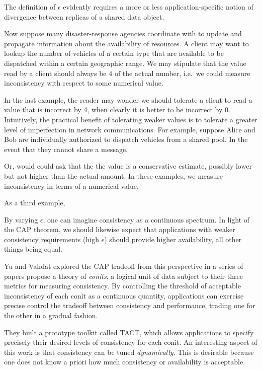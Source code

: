 \documentclass[]             %
{NASA}                       %
\theoremstyle{definition}
\begin{document}
The definition of \(\epsilon\) evidently requires a more or less
application-specific notion of divergence between replicas of a shared
data object.

Now suppose many disaster-response agencies coordinate with to update
and propagate information about the availability of resources. A client
may want to lookup the number of vehicles of a certain type that are
available to be dispatched within a certain geographic range. We may
stipulate that the value read by a client should always be \(4\) of the
actual number, i.e.~we could measure inconsistency with respect to some
numerical value.

In the last example, the reader may wonder we should tolerate a client
to read a value that is incorrect by 4, when clearly it is better to be
incorrect by 0. Intuitively, the practical benefit of tolerating weaker
values is to tolerate a greater level of imperfection in network
communications. For example, suppose Alice and Bob are individually
authorized to dispatch vehicles from a shared pool. In the event that
they cannot share a message.

Or, would could ask that the the value is a conservative estimate,
possibly lower but not higher than the actual amount. In these examples,
we measure inconsistency in terms of a numerical value.

As a third example,

By varying \(\epsilon\), one can imagine consistency as a continuous
spectrum. In light of the CAP theorem, we should likewise expect that
applications with weaker consistency requirements (high \(\epsilon\))
should provide higher availability, all other things being equal.

Yu and Vahdat explored the CAP tradeoff from this perspective in a
series of papers \cite{2000tact,2000tactalgorithms,10.5555/1251229.1251250,DBLP:conf/icdcs/YuV01,2002tact}
propose a theory of \emph{conits}, a logical unit of data subject to
their three metrics for measuring consistency. By controlling the
threshold of acceptable inconsistency of each conit as a continuous
quantity, applications can exercise precise control the tradeoff between
consistency and performance, trading one for the other in a gradual
fashion.

They built a prototype toolkit called TACT, which allows applications to
specify precisely their desired levels of consistency for each conit. An
interesting aspect of this work is that consistency can be tuned
\emph{dynamically}. This is desirable because one does not know a priori
how much consistency or availability is acceptable.
\end{document}
